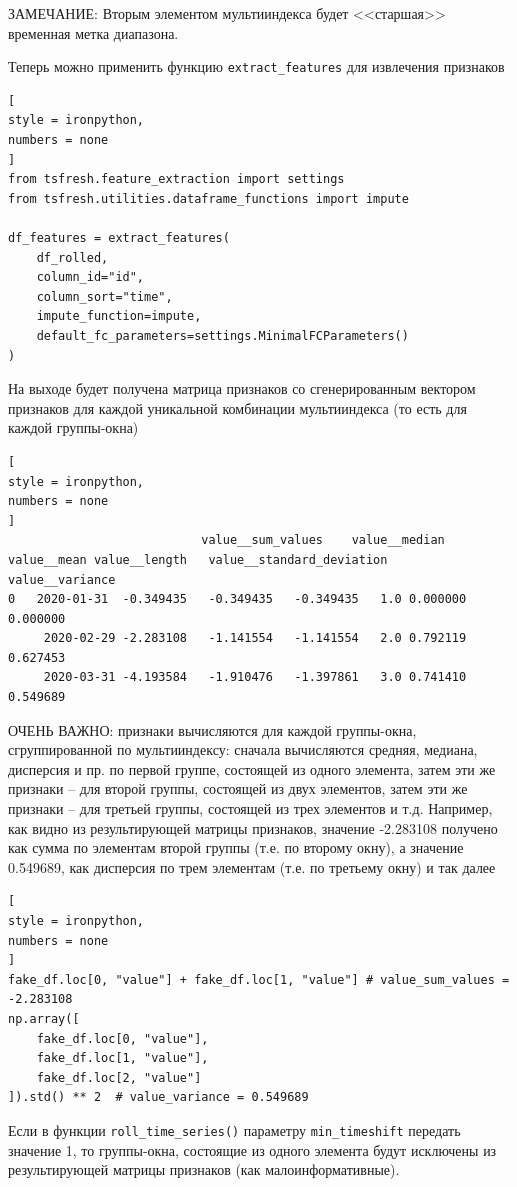 \documentclass[%
	11pt,
	a4paper,
	utf8,
		]{article}
\begin{document}
ЗАМЕЧАНИЕ: Вторым элементом мультииндекса будет <<старшая>> временная метка диапазона.

Теперь можно применить функцию \texttt{extract\_features} для извлечения признаков
\begin{lstlisting}[
style = ironpython,
numbers = none	
]
from tsfresh.feature_extraction import settings
from tsfresh.utilities.dataframe_functions import impute

df_features = extract_features(
    df_rolled,
    column_id="id",
    column_sort="time",
    impute_function=impute,
    default_fc_parameters=settings.MinimalFCParameters()
)
\end{lstlisting}

На выходе будет получена матрица признаков со сгенерированным вектором признаков для каждой уникальной комбинации мультииндекса (то есть для каждой группы-окна)
\begin{lstlisting}[
style = ironpython,
numbers = none	
]
	                       value__sum_values	value__median	value__mean	value__length	value__standard_deviation	value__variance	
0	2020-01-31	-0.349435	-0.349435	-0.349435	1.0	0.000000	0.000000
     2020-02-29	-2.283108	-1.141554	-1.141554	2.0	0.792119	0.627453
     2020-03-31	-4.193584	-1.910476	-1.397861	3.0	0.741410	0.549689
\end{lstlisting}

ОЧЕНЬ ВАЖНО: признаки вычисляются для каждой группы-окна, сгруппированной по мультииндексу: сначала вычисляются средняя, медиана, дисперсия и пр. по первой группе, состоящей из одного элемента, затем эти же признаки -- для второй группы, состоящей из двух элементов, затем эти же признаки -- для третьей группы, состоящей из трех элементов и т.д. Например, как видно из результирующей матрицы признаков, значение -2.283108 получено как сумма по элементам второй группы (т.е. по второму окну), а значение 0.549689, как дисперсия по трем элементам (т.е. по третьему окну) и так далее
\begin{lstlisting}[
style = ironpython,
numbers = none	
]
fake_df.loc[0, "value"] + fake_df.loc[1, "value"] # value_sum_values = -2.283108
np.array([
    fake_df.loc[0, "value"],
    fake_df.loc[1, "value"],
    fake_df.loc[2, "value"]
]).std() ** 2  # value_variance = 0.549689
\end{lstlisting}

Если в функции \texttt{roll\_time\_series()} параметру \texttt{min\_timeshift} передать значение 1, то группы-окна, состоящие из одного элемента будут исключены из результирующей матрицы признаков (как малоинформативные).
\end{document}
